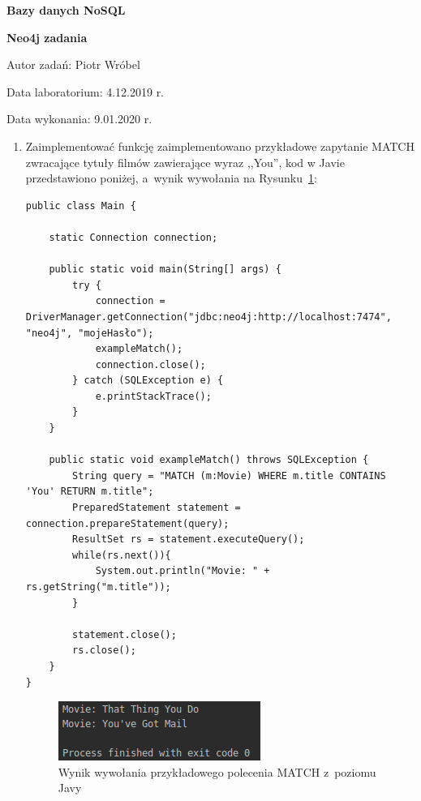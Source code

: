 \documentclass[a4paper,9pt]{extarticle}	%
\begin{document}
\begin{center}

{\LARGE \textbf{Bazy danych \ppauza NoSQL}}


{\Large \textbf{Neo4j \ppauza zadania}}

\end{center}

Autor zadań: Piotr Wróbel

Data laboratorium: 4.12.2019 r.

Data wykonania: 9.01.2020 r.

\begin{enumerate}
  \item Zaimplementować funkcję \ppauza zaimplementowano przykładowe zapytanie MATCH zwracające tytuły filmów zawierające wyraz ,,You'', kod w Javie przedstawiono poniżej, a~wynik wywołania na Rysunku~\ref{scrn:1}:
  \begin{lstlisting}
public class Main {

    static Connection connection;

    public static void main(String[] args) {
        try {
            connection = DriverManager.getConnection("jdbc:neo4j:http://localhost:7474", "neo4j", "mojeHasło");
            exampleMatch();
            connection.close();
        } catch (SQLException e) {
            e.printStackTrace();
        }
    }

    public static void exampleMatch() throws SQLException {
        String query = "MATCH (m:Movie) WHERE m.title CONTAINS 'You' RETURN m.title";
        PreparedStatement statement = connection.prepareStatement(query);
        ResultSet rs = statement.executeQuery();
        while(rs.next()){
            System.out.println("Movie: " + rs.getString("m.title"));
        }

        statement.close();
        rs.close();
    }
}
  \end{lstlisting}
  
  \begin{figure}[ht]
    \centering
    \includegraphics[scale=0.5]{screeny/1.png}
    \caption{Wynik wywołania przykładowego polecenia MATCH z~poziomu Javy}
    \label{scrn:1}
  \end{figure}
  

\end{enumerate}
\end{document}

